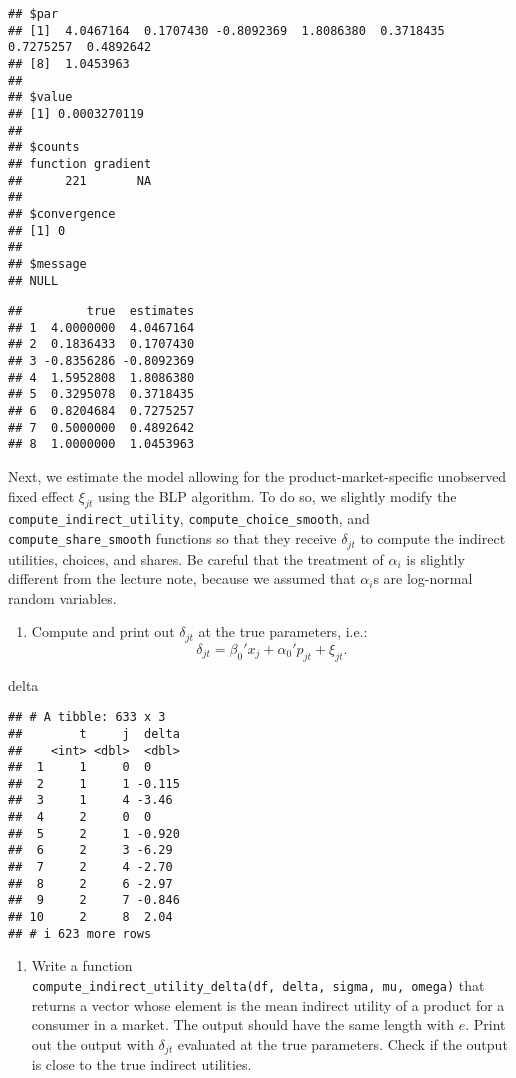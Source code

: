 \documentclass[
]{book}
\newenvironment{Shaded}{\begin{snugshade}}{\end{snugshade}}
\newcommand{\NormalTok}[1]{#1}
\providecommand{\tightlist}{%
  \setlength{\itemsep}{0pt}\setlength{\parskip}{0pt}}
\begin{document}
\begin{verbatim}
## $par
## [1]  4.0467164  0.1707430 -0.8092369  1.8086380  0.3718435  0.7275257  0.4892642
## [8]  1.0453963
## 
## $value
## [1] 0.0003270119
## 
## $counts
## function gradient 
##      221       NA 
## 
## $convergence
## [1] 0
## 
## $message
## NULL
\end{verbatim}

\begin{verbatim}
##         true  estimates
## 1  4.0000000  4.0467164
## 2  0.1836433  0.1707430
## 3 -0.8356286 -0.8092369
## 4  1.5952808  1.8086380
## 5  0.3295078  0.3718435
## 6  0.8204684  0.7275257
## 7  0.5000000  0.4892642
## 8  1.0000000  1.0453963
\end{verbatim}

Next, we estimate the model allowing for the product-market-specific unobserved fixed effect \(\xi_{jt}\) using the BLP algorithm. To do so, we slightly modify the \texttt{compute\_indirect\_utility}, \texttt{compute\_choice\_smooth}, and \texttt{compute\_share\_smooth} functions so that they receive \(\delta_{jt}\) to compute the indirect utilities, choices, and shares. Be careful that the treatment of \(\alpha_i\) is slightly different from the lecture note, because we assumed that \(\alpha_i\)s are log-normal random variables.

\begin{enumerate}
\def\labelenumi{\arabic{enumi}.}
\setcounter{enumi}{3}
\tightlist
\item
  Compute and print out \(\delta_{jt}\) at the true parameters, i.e.:
  \[
  \delta_{jt} = \beta_0' x_j + \alpha_0' p_{jt} + \xi_{jt}.
  \]
\end{enumerate}

\begin{Shaded}
\begin{Highlighting}[]
\NormalTok{delta}
\end{Highlighting}
\end{Shaded}

\begin{verbatim}
## # A tibble: 633 x 3
##        t     j  delta
##    <int> <dbl>  <dbl>
##  1     1     0  0    
##  2     1     1 -0.115
##  3     1     4 -3.46 
##  4     2     0  0    
##  5     2     1 -0.920
##  6     2     3 -6.29 
##  7     2     4 -2.70 
##  8     2     6 -2.97 
##  9     2     7 -0.846
## 10     2     8  2.04 
## # i 623 more rows
\end{verbatim}

\begin{enumerate}
\def\labelenumi{\arabic{enumi}.}
\setcounter{enumi}{4}
\tightlist
\item
  Write a function \texttt{compute\_indirect\_utility\_delta(df,\ delta,\ sigma,\ mu,\ omega)} that returns a vector whose element is the mean indirect utility of a product for a consumer in a market. The output should have the same length with \(e\). Print out the output with \(\delta_{jt}\) evaluated at the true parameters. Check if the output is close to the true indirect utilities.
\end{enumerate}
\end{document}
